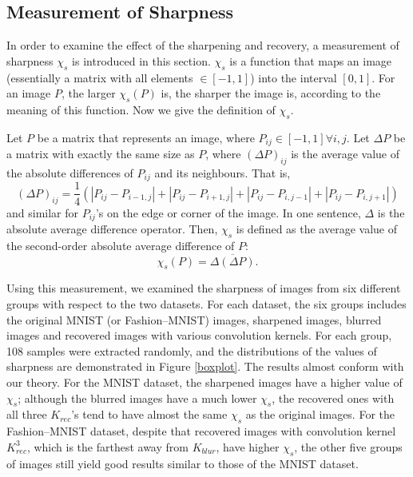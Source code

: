 \documentclass{article}
\begin{document}
\subsection{Measurement of Sharpness}
In order to examine the effect of the sharpening and recovery, a measurement of sharpness $\chi_s$ is introduced in this section. $\chi_s$ is a function that maps an image (essentially a matrix with all elements $\in[-1,1]$) into the interval $[0,1]$. For an image $P$, the larger $\chi_s(P)$ is, the sharper the image is, according to the meaning of this function. Now we give the definition of $\chi_s$.

Let $P$ be a matrix that represents an image, where $P_{ij}\in[-1,1]\forall i,j$. Let $\Delta P$ be a matrix with exactly the same size as $P$, where $(\Delta P)_{ij}$ is the average value of the absolute differences of $P_{ij}$ and its neighbours. That is,
\begin{equation}
(\Delta P)_{ij}=\frac14
\left(
|P_{ij}-P_{i-1,j}|+|P_{ij}-P_{i+1,j}|
+|P_{ij}-P_{i,j-1}|+|P_{ij}-P_{i,j+1}|
\right)
\end{equation}
and similar for $P_{ij}$'s on the edge or corner of the image. In one sentence, $\Delta$ is the absolute average difference operator. Then, $\chi_s$ is defined as the average value of the second-order absolute average difference of $P$:
\begin{equation}
\chi_s(P)=\overline{\Delta(\Delta P)}.
\end{equation}

Using this measurement, we examined the sharpness of images from six different groups with respect to the two datasets. For each dataset, the six groups includes the original MNIST (or Fashion--MNIST) images, sharpened images, blurred images and recovered images with various convolution kernels. For each group, 108 samples were extracted randomly, and the distributions of the values of sharpness are demonstrated in Figure \ref{boxplot}. The results almost conform with our theory. For the MNIST dataset, the sharpened images have a higher value of $\chi_s$; although the blurred images have a much lower $\chi_s$, the recovered ones with all three $K_{rec}$'s tend to have almost the same $\chi_s$ as the original images. For the Fashion--MNIST dataset, despite that recovered images with convolution kernel $K_{rec}^3$, which is the farthest away from $K_{blur}$, have higher $\chi_s$, the other five groups of images still yield good results similar to those of the MNIST dataset.
\end{document}
